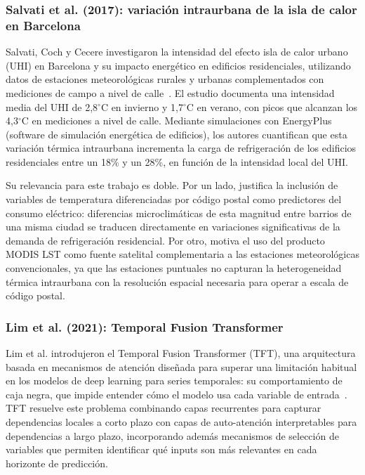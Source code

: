 \documentclass[12pt, a4paper]{article}
\begin{document}
\subsubsection{Salvati et al. (2017): variación intraurbana de la isla de calor en Barcelona}

Salvati, Coch y Cecere investigaron la intensidad del efecto isla de calor urbano (UHI) en Barcelona y su impacto energético en edificios residenciales, utilizando datos de estaciones meteorológicas rurales y urbanas complementados con mediciones de campo a nivel de calle~\cite{salvati2017}. El estudio documenta una intensidad media del UHI de 2,8$^\circ$C en invierno y 1,7$^\circ$C en verano, con picos que alcanzan los 4,3$^\circ$C en mediciones a nivel de calle. Mediante simulaciones con EnergyPlus (software de simulación energética de edificios), los autores cuantifican que esta variación térmica intraurbana incrementa la carga de refrigeración de los edificios residenciales entre un 18\% y un 28\%, en función de la intensidad local del UHI.

Su relevancia para este trabajo es doble. Por un lado, justifica la inclusión de variables de temperatura diferenciadas por código postal como predictores del consumo eléctrico: diferencias microclimáticas de esta magnitud entre barrios de una misma ciudad se traducen directamente en variaciones significativas de la demanda de refrigeración residencial. Por otro, motiva el uso del producto MODIS LST como fuente satelital complementaria a las estaciones meteorológicas convencionales, ya que las estaciones puntuales no capturan la heterogeneidad térmica intraurbana con la resolución espacial necesaria para operar a escala de código postal.

\subsubsection{Lim et al. (2021): Temporal Fusion Transformer}

Lim et al. introdujeron el Temporal Fusion Transformer (TFT), una arquitectura basada en mecanismos de atención diseñada para superar una limitación habitual en los modelos de deep learning para series temporales: su comportamiento de caja negra, que impide entender cómo el modelo usa cada variable de entrada~\cite{lim2021}. TFT resuelve este problema combinando capas recurrentes para capturar dependencias locales a corto plazo con capas de auto-atención interpretables para dependencias a largo plazo, incorporando además mecanismos de selección de variables que permiten identificar qué inputs son más relevantes en cada horizonte de predicción.
\end{document}
